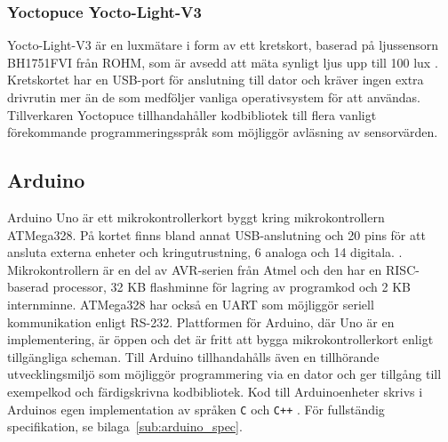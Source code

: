         \subsubsection{Yoctopuce Yocto-Light-V3} %
        \label{sub:yocto}
            Yocto-Light-V3 är en luxmätare i form av ett kretskort, baserad på ljussensorn BH1751FVI från ROHM, som är avsedd att mäta synligt ljus upp till 100 lux \cite{yocto}. Kretskortet har en USB-port för anslutning till dator och kräver ingen extra drivrutin mer än de som medföljer vanliga operativsystem för att användas. Tillverkaren Yoctopuce tillhandahåller kodbibliotek till flera vanligt förekommande programmeringsspråk som möjliggör avläsning av sensorvärden.
    \newpage
    \subsection{Arduino} %
    \label{ssub:arduino_uno}
        Arduino Uno är ett mikrokontrollerkort byggt kring mikrokontrollern ATMega328. På kortet finns bland annat USB-anslutning och 20 pins för att ansluta externa enheter och kringutrustning, 6 analoga och 14 digitala. \cite[kap.~1]{ard_internals}. Mikrokontrollern är en del av AVR-serien från Atmel och den har en RISC-baserad processor, 32 KB flashminne för lagring av programkod och 2 KB internminne. ATMega328 har också en UART som möjliggör seriell kommunikation enligt RS-232. Plattformen för Arduino, där Uno är en implementering, är öppen och det är fritt att bygga mikrokontrollerkort enligt tillgängliga scheman. Till Arduino tillhandahålls även en tillhörande utvecklingsmiljö som möjliggör programmering via en dator och ger tillgång till exempelkod och färdigskrivna kodbibliotek. Kod till Arduinoenheter skrivs i Arduinos egen implementation av språken \texttt{C} och \texttt{C++} \cites[kap.~2]{ard_c}{ard_cplusplus}. För fullständig specifikation, se bilaga~\ref{sub:arduino_spec}.
